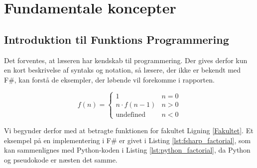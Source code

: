 
\section{Fundamentale koncepter}
\subsection{Introduktion til Funktions Programmering}
Det forventes, at læseren har kendskab til programmering. Der gives derfor kun en kort beskrivelse af syntaks og notation, så læsere, der ikke er bekendt med F\#, kan forstå de eksempler, der løbende vil forekomme i rapporten.

\begin{equation}
    \label{Fakultet}
    f(n) = \begin{cases} 
            1 &  n = 0  \\
            n \cdot f(n-1) & n > 0 \\
            \text{undefined} & n < 0 
           \end{cases}
\end{equation}

Vi begynder derfor med at betragte funktionen for fakultet Ligning \ref{Fakultet}. Et eksempel på en implementering i F\# er givet i Listing \ref{lst:fsharp_factorial}, som kan sammenlignes med Python-koden i Listing \ref{lst:python_factorial}, da Python og pseudokode er næsten det samme.






